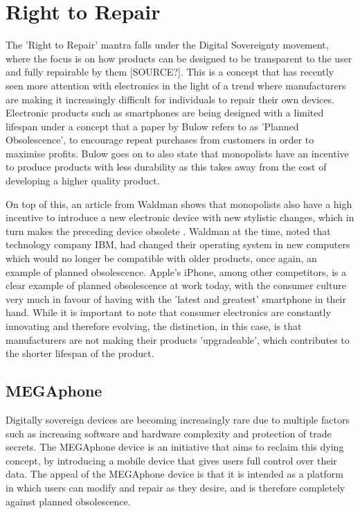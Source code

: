 \section{Right to Repair}

The 'Right to Repair' mantra falls under the Digital Sovereignty movement, where the focus is on how products can be designed to be transparent to the user and fully repairable by them [SOURCE?].
This is a concept that has recently seen more attention with electronics in the light of a trend where manufacturers are making it increasingly difficult for individuals to repair their own devices.
Electronic products such as smartphones are being designed with a limited lifespan under a concept that a paper by Bulow \cite{obsolescence} refers to as 'Planned Obsolescence', to encourage repeat purchases from customers in order to maximise profits.
Bulow goes on to also state that monopolists have an incentive to produce products with less durability as this takes away from the cost of developing a higher quality product.

On top of this, an article from Waldman shows that monopolists also have a high incentive to introduce a new electronic device with new stylistic changes, which in turn makes the preceding device obsolete \cite{obsolescence2}.
Waldman at the time, noted that technology company IBM, had changed their operating system in new computers which would no longer be compatible with older products, once again, an example of planned obsolescence.
Apple's iPhone, among other competitors, is a clear example of planned obsolescence at work today, with the consumer culture very much in favour of having with the 'latest and greatest' smartphone in their hand.
While it is important to note that consumer electronics are constantly innovating and therefore evolving, the distinction, in this case, is that manufacturers are not making their products 'upgradeable', which contributes to the shorter lifespan of the product.

\subsection{MEGAphone}

Digitally sovereign devices are becoming increasingly rare due to multiple factors such as increasing software and hardware complexity and protection of trade secrets.
The MEGAphone device is an initiative that aims to reclaim this dying concept, by introducing a mobile device that gives users full control over their data.
The appeal of the MEGAphone device is that it is intended as a platform in which users can modify and repair as they desire, and is therefore completely against planned obsolescence.

